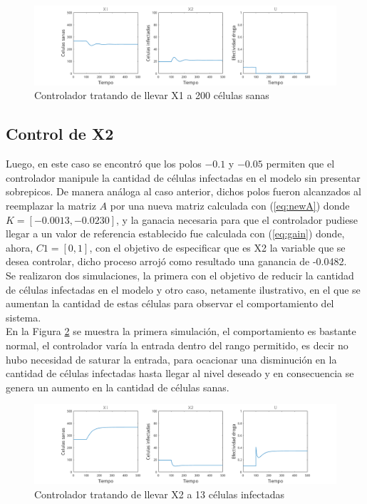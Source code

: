 \documentclass{article}
\begin{document}
\begin{figure}[H]
    \includegraphics[width=\textwidth]{Images/ControlX1Down.png}
    \caption{Controlador tratando de llevar X1 a 200 células sanas}
    \label{fig:x1to200}
\end{figure}

\subsection{Control de X2}

Luego, en este caso se encontró que los polos $-0.1$ y $-0.05$ permiten que
el controlador manipule la cantidad de células infectadas en el modelo sin
presentar sobrepicos. De manera análoga al caso anterior, dichos polos fueron
alcanzados al reemplazar la matriz $A$ por una nueva matriz calculada con
(\ref{eq:newA}) donde $K=[-0.0013, -0.0230]$, y la ganacia
necesaria para que el controlador pudiese llegar a un valor de referencia
establecido fue calculada con (\ref{eq:gain}) donde, ahora, $C1 = [0, 1]$, con el
objetivo de especificar que es X2 la variable que se desea controlar, dicho
proceso arrojó como resultado una ganancia de -0.0482.\\

Se realizaron dos simulaciones, la primera con el objetivo de reducir la cantidad
de células infectadas en el modelo y otro caso, netamente ilustrativo, en el que
se aumentan la cantidad de estas células para observar el comportamiento del
sistema. \\

En la Figura \ref{fig:x2to13} se muestra la primera simulación, el
comportamiento es bastante normal, el controlador varía la entrada dentro del
rango permitido, es decir no hubo necesidad de saturar la entrada, para
ocacionar una disminución en la cantidad de células infectadas hasta llegar al
nivel deseado y en consecuencia se genera un aumento en la cantidad de células sanas.

\begin{figure}[H]
    \includegraphics[width=\textwidth]{Images/ControlX2Down.png}
    \caption{Controlador tratando de llevar X2 a 13 células infectadas}
    \label{fig:x2to13}
\end{figure}
\end{document}
